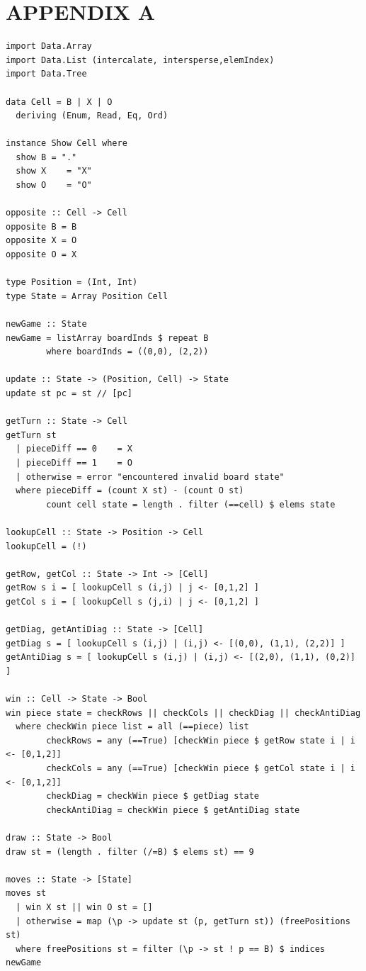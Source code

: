 \documentclass[titlepage]{article}
\begin{document}
\section{APPENDIX A}
\label{sec:org1fd0978}
\begin{verbatim}
import Data.Array
import Data.List (intercalate, intersperse,elemIndex)
import Data.Tree

data Cell = B | X | O
  deriving (Enum, Read, Eq, Ord)

instance Show Cell where
  show B = "."
  show X    = "X"
  show O    = "O"

opposite :: Cell -> Cell
opposite B = B
opposite X = O
opposite O = X

type Position = (Int, Int)
type State = Array Position Cell

newGame :: State
newGame = listArray boardInds $ repeat B
        where boardInds = ((0,0), (2,2))

update :: State -> (Position, Cell) -> State
update st pc = st // [pc]

getTurn :: State -> Cell
getTurn st
  | pieceDiff == 0    = X
  | pieceDiff == 1    = O
  | otherwise = error "encountered invalid board state"
  where pieceDiff = (count X st) - (count O st)
        count cell state = length . filter (==cell) $ elems state

lookupCell :: State -> Position -> Cell
lookupCell = (!)

getRow, getCol :: State -> Int -> [Cell]
getRow s i = [ lookupCell s (i,j) | j <- [0,1,2] ]
getCol s i = [ lookupCell s (j,i) | j <- [0,1,2] ]

getDiag, getAntiDiag :: State -> [Cell]
getDiag s = [ lookupCell s (i,j) | (i,j) <- [(0,0), (1,1), (2,2)] ]
getAntiDiag s = [ lookupCell s (i,j) | (i,j) <- [(2,0), (1,1), (0,2)] ]

win :: Cell -> State -> Bool
win piece state = checkRows || checkCols || checkDiag || checkAntiDiag
  where checkWin piece list = all (==piece) list
        checkRows = any (==True) [checkWin piece $ getRow state i | i <- [0,1,2]]
        checkCols = any (==True) [checkWin piece $ getCol state i | i <- [0,1,2]]
        checkDiag = checkWin piece $ getDiag state
        checkAntiDiag = checkWin piece $ getAntiDiag state

draw :: State -> Bool
draw st = (length . filter (/=B) $ elems st) == 9

moves :: State -> [State]
moves st
  | win X st || win O st = []
  | otherwise = map (\p -> update st (p, getTurn st)) (freePositions st)
  where freePositions st = filter (\p -> st ! p == B) $ indices newGame



\end{verbatim}
\end{document}
